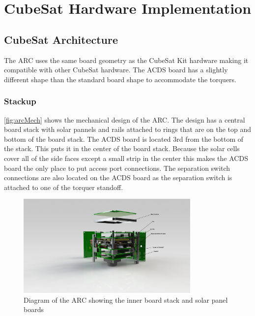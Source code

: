 
\chapter{CubeSat Hardware Implementation}

\label{ch:CubeSatHardware}

\section{CubeSat Architecture}


The \ac{ARC} uses the same board geometry as the CubeSat Kit\cite{CSK} hardware making it compatible with other CubeSat hardware. The \ac{ACDS} board has a slightly different shape than the standard board shape to accommodate the torquers.

\subsection{Stackup}

\autoref{fig:arcMech} shows the mechanical design of the \ac{ARC}. The design has a central board stack with solar pannels and rails attached to rings that are on the top and bottom of the board stack. The \ac{ACDS} board is located 3rd from the bottom of the stack. This puts it in the center of the board stack. Because the solar cells cover all of the side faces except a small strip in the center this makes the \ac{ACDS} board the only place to put access port connections. The separation switch connections are also located on the \ac{ACDS} board as the separation switch is attached to one of the torquer standoff.

\begin{figure}[H]
    \centering
    \includegraphics[width=0.8\textwidth]{Figures/CubeSat-Diagram}
    \caption{Diagram of the \ac{ARC} showing the inner board stack and solar panel boards}
    \label{fig:arcMech}
\end{figure}

